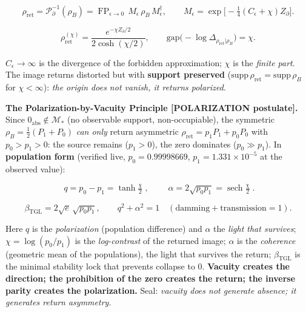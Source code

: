 \documentclass[11pt]{article}
\theoremstyle{definition}\newtheorem{deriv}{Derivation}
\begin{document}
\begin{equation}\rho_{\mathrm{ret}}=\mathcal P_\partial^{-1}(\rho_B)=\operatorname{FP}_{\epsilon\to0}\,M_\epsilon\,\rho_B\,M_\epsilon^\dagger,\qquad M_\epsilon=\exp\!\big[-\tfrac14(C_\epsilon+\chi)Z_\partial\big].\end{equation}

\begin{equation}\rho_{\mathrm{ret}}^{(\chi)}=\frac{e^{-\chi Z_\partial/2}}{2\cosh(\chi/2)},\qquad \mathrm{gap}\big({-}\log\Delta_{\rho_{\mathrm{ret}}|\rho_B}\big)=\chi.\end{equation}

$C_\epsilon\to\infty$ is the divergence of the forbidden approximation; $\chi$ is the \emph{finite part}. The image returns distorted but with \textbf{support preserved} ($\mathrm{supp}\,\rho_{\mathrm{ret}}=\mathrm{supp}\,\rho_B$ for $\chi<\infty$): \emph{the origin does not vanish, it returns polarized}.

\textbf{The Polarization-by-Vacuity Principle \textsf{[POLARIZATION postulate]}.} Since $0_{\mathrm{abs}}\notin\mathcal M_*$ (no observable support, non-occupiable), the symmetric $\rho_B=\tfrac12(P_1+P_0)$ \emph{can only} return asymmetric $\rho_{\mathrm{ret}}=p_1P_1+p_0P_0$ with $p_0>p_1>0$: the source remains ($p_1>0$), the zero dominates ($p_0\gg p_1$). In \textbf{population form} (verified live, $p_0=0.99998669$, $p_1=1.331\times10^{-5}$ at the observed value):

\begin{equation}\boxed{\;q=p_0-p_1=\tanh\tfrac\chi2\;},\qquad \boxed{\;\alpha=2\sqrt{p_0p_1}=\operatorname{sech}\tfrac\chi2\;}.\end{equation}

\begin{equation}\beta_{\mathrm{TGL}}=2\sqrt e\,\sqrt{p_0p_1},\qquad q^2+\alpha^2=1\quad(\text{damming}+\text{transmission}=1).\end{equation}

Here $q$ is the \emph{polarization} (population difference) and $\alpha$ the \emph{light that survives}; $\chi=\log(p_0/p_1)$ is the \emph{log-contrast} of the returned image; $\alpha$ is the \emph{coherence} (geometric mean of the populations), the light that survives the return; $\beta_{\mathrm{TGL}}$ is the minimal stability lock that prevents collapse to $0$. \textbf{Vacuity creates the direction; the prohibition of the zero creates the return; the inverse parity creates the polarization.} Seal: \emph{vacuity does not generate absence; it generates return asymmetry.}
\end{document}
